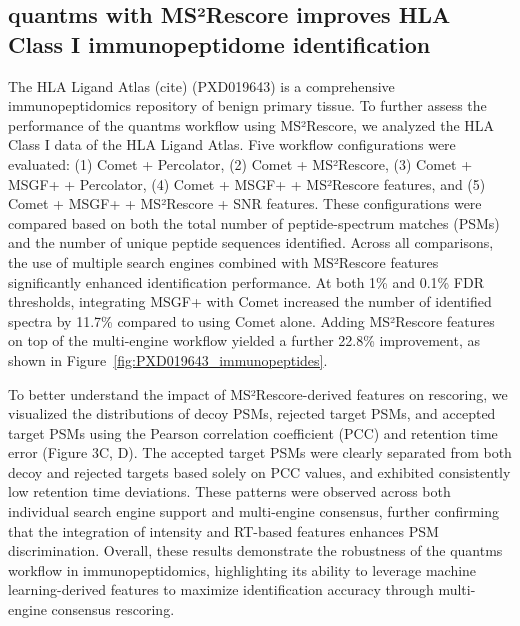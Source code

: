 \documentclass[12pt]{article}
\begin{document}
\subsection{quantms with MS²Rescore improves HLA Class I immunopeptidome identification}
The HLA Ligand Atlas (cite) (PXD019643) is a comprehensive immunopeptidomics repository of benign primary tissue. To further assess the performance of the quantms workflow using MS²Rescore, we analyzed the HLA Class I data of the HLA Ligand Atlas. %
Five workflow configurations were evaluated: (1) Comet + Percolator, (2) Comet + MS²Rescore, (3) Comet + MSGF+ + Percolator, (4) Comet + MSGF+ + MS²Rescore features, and (5) Comet + MSGF+ + MS²Rescore + SNR features. %
These configurations were compared based on both the total number of peptide-spectrum matches (PSMs) and the number of unique peptide sequences identified. Across all comparisons, the use of multiple search engines combined with MS²Rescore features significantly enhanced identification performance. At both 1\% and 0.1\% FDR thresholds, %
integrating MSGF+ with Comet increased the number of identified spectra by 11.7\% compared to using Comet alone. Adding MS²Rescore features on top of the multi-engine workflow yielded a further 22.8\% improvement, as shown in Figure~\ref{fig:PXD019643_immunopeptides}.

To better understand the impact of MS²Rescore-derived features on rescoring, we visualized the distributions of decoy PSMs, rejected target PSMs, and accepted target PSMs using the Pearson correlation coefficient (PCC) and retention time error (Figure 3C, D). The accepted target PSMs were clearly separated from both decoy and rejected targets based solely on PCC values, and exhibited consistently low retention time deviations. %
These patterns were observed across both individual search engine support and multi-engine consensus, further confirming that the integration of intensity and RT-based features enhances PSM discrimination. Overall, these results demonstrate the robustness of the quantms workflow in immunopeptidomics, highlighting its ability to leverage machine learning-derived features to maximize identification accuracy through multi-engine consensus rescoring.
\end{document}
